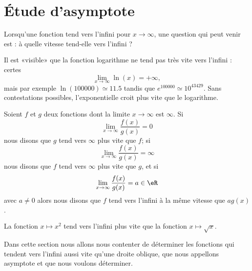 
\section{Étude d'asymptote}

Lorsqu'une fonction tend vers l'infini pour \( x\to \infty\), une question qui peut venir est : à quelle vitesse tend-elle vers l'infini ?

Il est «visible» que la fonction logarithme ne tend pas très vite vers l'infini : certes
\begin{equation}
	\lim_{x\to \infty} \ln(x)=+\infty,
\end{equation}
mais par exemple \( \ln(100000)\simeq 11.5\) tandis que \(  e^{100000}\simeq 10^{43429}\). Sans contestations possibles, l'exponentielle croit plus vite que le logarithme.

Soient \( f\) et \( g\) deux fonctions dont la limite \( x\to \infty\) est \( \infty\). Si
\begin{equation}
	\lim_{x\to \infty} \frac{ f(x) }{ g(x) }=0
\end{equation}
nous disons que \( g\) tend vers \( \infty\) plus vite que \( f\); si
\begin{equation}
	\lim_{x\to \infty} \frac{ f(x) }{ g(x) }=\infty
\end{equation}
nous disons que \( f\) tend vers \( \infty\) plus vite que \( g\), et si
\begin{equation}
	\lim_{x\to \infty} \frac{ f(x) }{ g(x) }=a\in \eR
\end{equation}
avec \( a\neq 0\) alors nous disons que \( f\) tend vers l'infini à la même vitesse que \( ag(x)\).

\begin{example}
	La fonction \( x\mapsto x^2\) tend vers l'infini plus vite que la fonction \( x\mapsto \sqrt{x}\).
\end{example}

Dans cette section nous allons nous contenter de déterminer les fonctions qui tendent vers l'infini aussi vite qu'une droite oblique, que nous appellons asymptote et que nous voulons déterminer.


